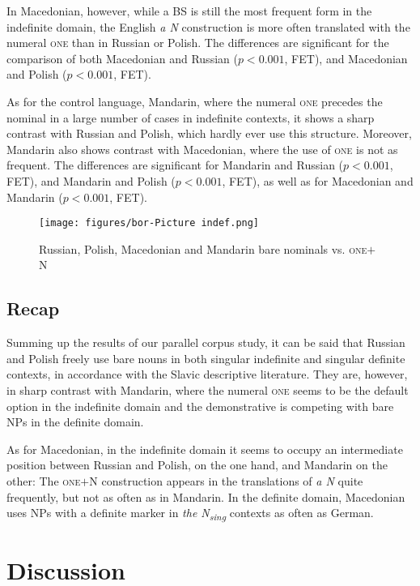 \documentclass[output=paper,colorlinks,citecolor=brown]{langscibook}
\begin{document}
In Macedonian, however, while a BS is still the most frequent form in the indefinite domain, the English \textit{a N} construction is more often translated with the numeral \textsc{one} than in Russian or Polish. The differences are significant for the comparison of both Macedonian and Russian ($p < 0.001$, FET), and  Macedonian and Polish ($p < 0.001$, FET). 

As for the control language, Mandarin, where the numeral \textsc{one} precedes the nominal in a large number of cases in indefinite contexts, it shows a sharp contrast with Russian and Polish, which hardly ever use this structure. Moreover, Mandarin also shows contrast with Macedonian, where the use of \textsc{one} is not as frequent. The differences are significant for Mandarin and Russian ($p < 0.001$, FET), and Mandarin and Polish ($p < 0.001$, FET), as well as for Macedonian and Mandarin ($p < 0.001$, FET).

\begin{figure}[H]
    \centering
    \texttt{[image: figures/bor-Picture indef.png]}
    \caption{Russian, Polish, Macedonian and Mandarin bare nominals vs. \textsc{one}$+$N}
    \label{fig:1}
\end{figure}

\subsection{Recap}
Summing up the results of our parallel corpus study, it can be said that Russian and Polish freely use bare nouns in both singular indefinite and singular definite contexts, in accordance with the Slavic descriptive literature. They are, however, in sharp contrast with Mandarin, where the numeral \textsc{one} seems to be the default option in the indefinite domain and the demonstrative is competing with bare NPs in the definite domain.

 As for Macedonian, in the indefinite domain it seems to occupy an intermediate position between Russian and Polish, on the one hand, and Mandarin on the other: The \textsc{one}$+$N construction appears in the translations of \textit{a N} quite frequently, but not as often as in Mandarin. In the definite domain, Macedonian uses NPs with a definite marker in \textit{the N{\textsubscript{sing}}} contexts as often as German.

\section{Discussion} \label{discussion}
\end{document}
